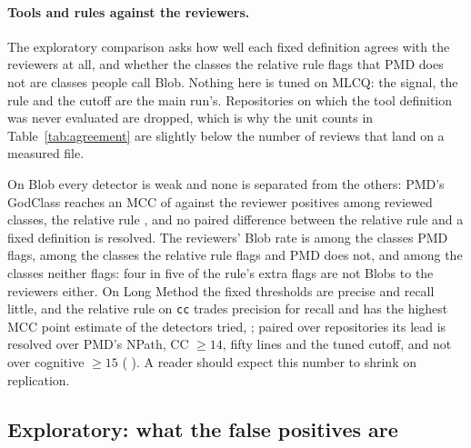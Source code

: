 \documentclass[11pt,a4paper]{article}
\newcommand{\fitwidth}[1]{\resizebox{\ifdim\width>\textwidth\textwidth\else\width\fi}{!}{#1}}
\newcommand{\sig}[1]{\texttt{#1}}
\begin{document}
\paragraph{Tools and rules against the reviewers.} The exploratory comparison
asks how well each fixed definition agrees with the reviewers at all, and
whether the classes the relative rule flags that PMD does not are classes
people call Blob. Nothing here is tuned on MLCQ: the signal, the rule and the
cutoff are the main run's. Repositories on which the tool definition was never
evaluated are dropped, which is why the unit counts in
Table~\ref{tab:agreement} are slightly below the number of reviews that land
on a measured file.

\begin{table}[t]
\centering
\caption{Exploratory: each fixed definition and the main run's two rules as a
predictor of the reviewers' verdict, over the reviewed units of every usable
MLCQ repository, with a 95\% repository bootstrap on the MCC.}
\label{tab:agreement}
\small
\setlength{\tabcolsep}{4pt}
\fitwidth{}
\end{table}

On Blob every detector is weak and none is separated from the others: PMD's
GodClass reaches an MCC of \agrBlobPmdGodclassMcc{} \agrBlobPmdGodclassMccCI{}
against the \agrBlobPos{} reviewer positives among \agrBlobUnits{} reviewed
classes, the relative rule \agrBlobRelMcc{} \agrBlobRelMccCI{}, and no paired
difference between the relative rule and a fixed definition is resolved. The
reviewers' Blob rate is \agrBlobGrpToolRate{} among the classes PMD flags,
\agrBlobGrpRelNotToolRate{} among the \agrBlobGrpRelNotToolN{} classes the
relative rule flags and PMD does not, and \agrBlobGrpNeitherRelNorToolRate{}
among the classes neither flags: four in five of the rule's extra flags are
not Blobs to the reviewers either. On Long Method the fixed thresholds are
precise and recall little, and the relative rule on \sig{cc} trades precision
for recall and has the highest MCC point estimate of the detectors tried,
\agrLmRelMcc{} \agrLmRelMccCI{}; paired over repositories its lead is
resolved over PMD's NPath, CC $\geq 14$, fifty lines and the tuned cutoff,
and not over cognitive $\geq 15$ (\agrLmRelMinusCognitiveOneFive{}
\agrLmRelMinusCognitiveOneFiveCI{}). A reader should expect this number to
shrink on replication.

\subsection{Exploratory: what the false positives are}
\label{sec:fp}
\end{document}
